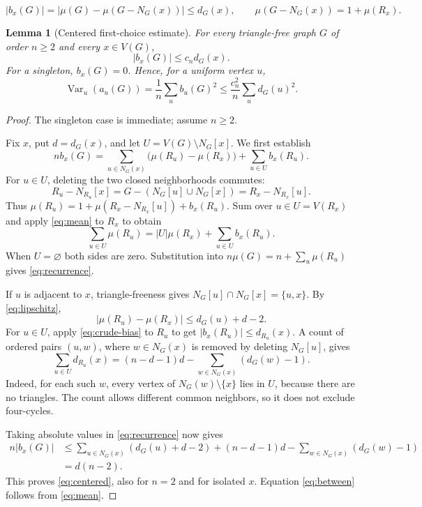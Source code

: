 \documentclass[10pt,a4paper]{amsart}
\newtheorem{lemma}{Lemma}
\newcommand{\Var}{\operatorname{Var}}
\begin{document}
\begin{equation}\label{eq:crude-bias}
 |b_x(G)|=|\mu(G)-\mu(G-N_G(x))|\le d_G(x),
 \qquad \mu(G-N_G(x))=1+\mu(R_x).
\end{equation}

\begin{lemma}[Centered first-choice estimate]\label{lem:centered}
For every triangle-free graph $G$ of order $n\ge2$ and every $x\in V(G)$,
\begin{equation}\label{eq:centered}
 |b_x(G)|\le c_n d_G(x).
\end{equation}
For a singleton, $b_x(G)=0$. Hence, for a uniform vertex $u$,
\begin{equation}\label{eq:between}
 \Var_u(a_u(G))=\frac1n\sum_u b_u(G)^2
 \le\frac{c_n^2}{n}\sum_u d_G(u)^2.
\end{equation}
\end{lemma}

\begin{proof}
The singleton case is immediate; assume $n\ge2$.

Fix $x$, put $d=d_G(x)$, and let $U=V(G)\setminus N_G[x]$. We first establish
\begin{equation}\label{eq:recurrence}
 n b_x(G)=\sum_{u\in N_G(x)}\bigl(\mu(R_u)-\mu(R_x)\bigr)
                  +\sum_{u\in U}b_x(R_u).
\end{equation}
For $u\in U$, deleting the two closed neighborhoods commutes:
\[
 R_u-N_{R_u}[x]=G-(N_G[u]\cup N_G[x])=R_x-N_{R_x}[u].
\]
Thus $\mu(R_u)=1+\mu(R_x-N_{R_x}[u])+b_x(R_u)$. Sum over $u\in U=V(R_x)$ and apply \eqref{eq:mean} to $R_x$ to obtain
\[
 \sum_{u\in U}\mu(R_u)=|U|\mu(R_x)+\sum_{u\in U}b_x(R_u).
\]
When $U=\varnothing$ both sides are zero. Substitution into $n\mu(G)=n+\sum_u\mu(R_u)$ gives \eqref{eq:recurrence}.

If $u$ is adjacent to $x$, triangle-freeness gives $N_G[u]\cap N_G[x]=\{u,x\}$. By \eqref{eq:lipschitz},
\[
 |\mu(R_u)-\mu(R_x)|\le d_G(u)+d-2.
\]
For $u\in U$, apply \eqref{eq:crude-bias} to $R_u$ to get $|b_x(R_u)|\le d_{R_u}(x)$. A count of ordered pairs $(u,w)$, where $w\in N_G(x)$ is removed by deleting $N_G[u]$, gives
\begin{equation}\label{eq:degreecount}
 \sum_{u\in U}d_{R_u}(x)
 =(n-d-1)d-\sum_{w\in N_G(x)}(d_G(w)-1).
\end{equation}
Indeed, for each such $w$, every vertex of $N_G(w)\setminus\{x\}$ lies in $U$, because there are no triangles. The count allows different common neighbors, so it does not exclude four-cycles.

Taking absolute values in \eqref{eq:recurrence} now gives
\begin{align*}
 n|b_x(G)|
 &\le \sum_{u\in N_G(x)}(d_G(u)+d-2)
 +(n-d-1)d-\sum_{w\in N_G(x)}(d_G(w)-1)\\
 &=d(n-2).
\end{align*}
This proves \eqref{eq:centered}, also for $n=2$ and for isolated $x$. Equation \eqref{eq:between} follows from \eqref{eq:mean}.
\end{proof}
\end{document}

